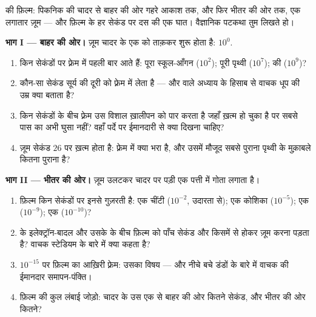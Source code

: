 \begin{problem}\label{pb:g9:atoms-to-galaxies:1}
 की फ़िल्म: पिकनिक की चादर से बाहर की ओर गहरे आकाश तक, और फिर
भीतर की ओर  तक, एक लगातार ज़ूम --- और फ़िल्म के हर सेकंड पर दस की
एक घात। वैज्ञानिक पटकथा तुम लिखते हो।

\medskip\noindent\textbf{भाग I --- बाहर की ओर।}
ज़ूम चादर के एक  को ताक़कर शुरू होता है: $10^{0}$.
\begin{enumerate}
  \item किन सेकंडों पर फ़्रेम में पहली बार आते हैं: पूरा स्कूल-आँगन
        ($10^{2}$); पूरी पृथ्वी ($10^{7}$);  की 
        ($10^{9}$)?
  \item कौन-सा सेकंड सूर्य की दूरी को फ़्रेम में लेता है --- और 
        वाले अध्याय के हिसाब से वाचक धूप की उम्र क्या बताता है?
  \item किन सेकंडों के बीच फ़्रेम उस विशाल ख़ालीपन को पार करता है जहाँ
         ख़त्म हो चुका है पर सबसे पास का  अभी घुसा नहीं?
        वहाँ पर्दे पर ईमानदारी से क्या दिखना चाहिए?
  \item ज़ूम सेकंड $26$ पर ख़त्म होता है: फ़्रेम में क्या भरा है, और
        उसमें मौजूद सबसे पुराना  पृथ्वी के मुक़ाबले कितना पुराना
        है?
\end{enumerate}

\medskip\noindent\textbf{भाग II --- भीतर की ओर।}
ज़ूम उलटकर चादर पर पड़ी एक पत्ती में गोता लगाता है।
\begin{enumerate}[resume]
  \item फ़िल्म किन सेकंडों पर इनसे गुज़रती है: एक चींटी ($10^{-2}$,
        उदारता से); एक कोशिका ($10^{-5}$); एक  ($10^{-9}$); एक
         ($10^{-10}$)?
  \item {} के इलेक्ट्रॉन-बादल और उसके  के बीच फ़िल्म को पाँच
        सेकंड और किसमें से होकर ज़ूम करना पड़ता है? वाचक स्टेडियम के
        बारे में क्या कहता है?
  \item $10^{-15}$ पर फ़िल्म का आख़िरी फ़्रेम: उसका विषय --- और नीचे
        बचे डंडों के बारे में वाचक की ईमानदार समापन-पंक्ति।
  \item फ़िल्म की कुल लंबाई जोड़ो: चादर के उस एक  से बाहर की ओर
        कितने सेकंड, और भीतर की ओर कितने?
\end{enumerate}


\end{problem}
